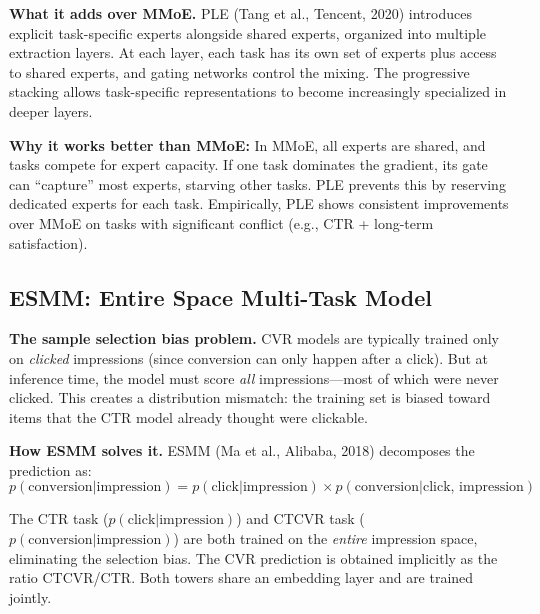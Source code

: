 \textbf{What it adds over MMoE.} PLE (Tang et al., Tencent, 2020) introduces explicit task-specific experts alongside shared experts, organized into multiple extraction layers. At each layer, each task has its own set of experts plus access to shared experts, and gating networks control the mixing. The progressive stacking allows task-specific representations to become increasingly specialized in deeper layers.

\textbf{Why it works better than MMoE:} In MMoE, all experts are shared, and tasks compete for expert capacity. If one task dominates the gradient, its gate can ``capture'' most experts, starving other tasks. PLE prevents this by reserving dedicated experts for each task. Empirically, PLE shows consistent improvements over MMoE on tasks with significant conflict (e.g., CTR + long-term satisfaction).

\subsection{ESMM: Entire Space Multi-Task Model}

\textbf{The sample selection bias problem.} CVR models are typically trained only on \textit{clicked} impressions (since conversion can only happen after a click). But at inference time, the model must score \textit{all} impressions---most of which were never clicked. This creates a distribution mismatch: the training set is biased toward items that the CTR model already thought were clickable.

\textbf{How ESMM solves it.} ESMM (Ma et al., Alibaba, 2018) decomposes the prediction as:
\begin{equation}
p(\text{conversion} | \text{impression}) = p(\text{click} | \text{impression}) \times p(\text{conversion} | \text{click, impression})
\end{equation}

The CTR task ($p(\text{click}|\text{impression})$) and CTCVR task ($p(\text{conversion}|\text{impression})$) are both trained on the \textit{entire} impression space, eliminating the selection bias. The CVR prediction is obtained implicitly as the ratio CTCVR/CTR. Both towers share an embedding layer and are trained jointly.

